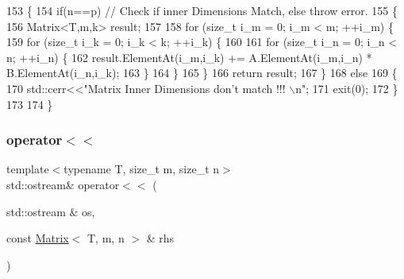 \begin{DoxyCode}
153                         \{
154                                 \textcolor{keywordflow}{if}(n==p) \textcolor{comment}{// Check if inner Dimensions Match, else throw error.}
155                                 \{
156                                         Matrix<T,m,k> result;
157 
158                                         \textcolor{keywordflow}{for} (\textcolor{keywordtype}{size\_t} i\_m = 0; i\_m < m; ++i\_m) \{
159                                                 \textcolor{keywordflow}{for} (\textcolor{keywordtype}{size\_t} i\_k = 0; i\_k < k; ++i\_k) \{
160 
161                                                         \textcolor{keywordflow}{for} (\textcolor{keywordtype}{size\_t} i\_n = 0; i\_n < n; ++i\_n) \{
162                                                         result.ElementAt(i\_m,i\_k) += A.ElementAt(i\_m,i\_n) *
       B.ElementAt(i\_n,i\_k);
163                                                         \}
164                                                 \}
165                                         \}
166                                         \textcolor{keywordflow}{return} result;
167                                 \}
168                                 \textcolor{keywordflow}{else}
169                                 \{
170                                         std::cerr<<\textcolor{stringliteral}{"Matrix Inner Dimensions don't match !!! \(\backslash\)n"};
171                                         exit(0);
172                                 \}
173 
174                         \}
\end{DoxyCode}
\mbox{\label{classMATOPS_1_1Matrix_ae239bcfdd34ba0b3693e1c11063afc6a}} 
\subsubsection{\texorpdfstring{operator$<$$<$}{operator<<}}
{\footnotesize\ttfamily template$<$typename T, size\+\_\+t m, size\+\_\+t n$>$ \\
std\+::ostream\& operator$<$$<$ (\begin{DoxyParamCaption}\item[{std\+::ostream \&}]{os,  }\item[{const \hyperlink{classMATOPS_1_1Matrix}{Matrix}$<$ T, m, n $>$ \&}]{rhs }\end{DoxyParamCaption})\hspace{0.3cm}{\ttfamily [friend]}}



